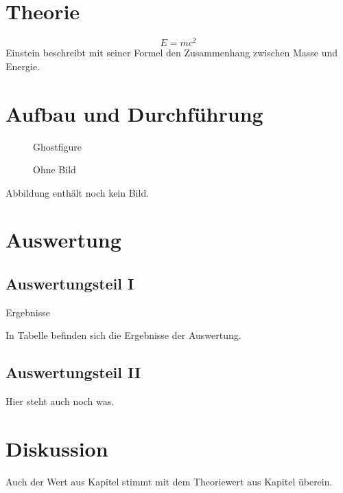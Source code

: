 \documentclass[titlepage=firstiscover]{scrartcl}
\begin{document}
\section{Theorie}
  \begin{equation}
      E = mc^2
  \end{equation}
  Einstein beschreibt mit seiner Formel den Zusammenhang zwischen Masse und Energie.
\section{Aufbau und Durchführung}
  \begin{figure}
    Ghostfigure
    \caption{Ohne Bild}
  \end{figure}
  Abbildung enthält noch kein Bild.
\section{Auswertung}
\subsection{Auswertungsteil I}
  \begin{table}
    \caption{Ergebnisse}
  \end{table}
  In Tabelle befinden sich die Ergebnisse der Auswertung.
\subsection{Auswertungsteil II}
  Hier steht auch noch was.
\section{Diskussion}
  Auch der Wert aus Kapitel stimmt mit dem Theoriewert aus Kapitel überein.
\end{document}
